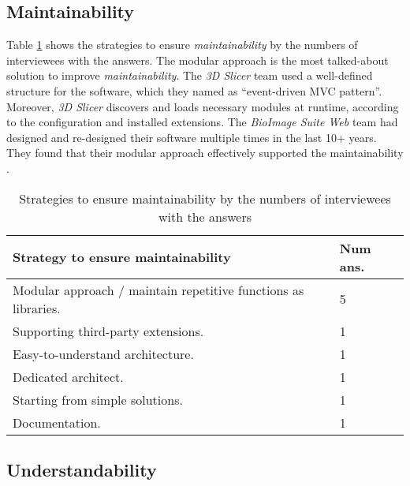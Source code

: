 \subsection{Maintainability}
\label{sec_interview_maintainability}

Table \ref{tab_q16_strategies_maintainability} shows the strategies to ensure \textit{maintainability} by the numbers of interviewees with the answers. The modular approach is the most talked-about solution to improve \textit{maintainability}. The \textit{3D Slicer} team used a well-defined structure for the software, which they named as ``event-driven MVC pattern''. Moreover, \textit{3D Slicer} discovers and loads necessary modules at runtime, according to the configuration and installed extensions. The \textit{BioImage Suite Web} team had designed and re-designed their software multiple times in the last 10+
years. They found that their modular approach effectively supported the maintainability \cite{Joshi2011}. 

\begin{table}[H]
\centering
\begin{tabular}{ll}
\hline
Strategy to ensure maintainability & Num ans. \\ \hline
Modular approach / maintain repetitive functions as libraries. & 5 \\
Supporting third-party extensions. & 1 \\
Easy-to-understand architecture. & 1 \\
Dedicated architect. & 1 \\
Starting from simple solutions. & 1 \\
Documentation. & 1 \\ \hline
\end{tabular}
\caption{\label{tab_q16_strategies_maintainability}Strategies to ensure maintainability by the numbers of interviewees with the answers}
\end{table}

\subsection{Understandability}
\label{sec_interview_understandability}

